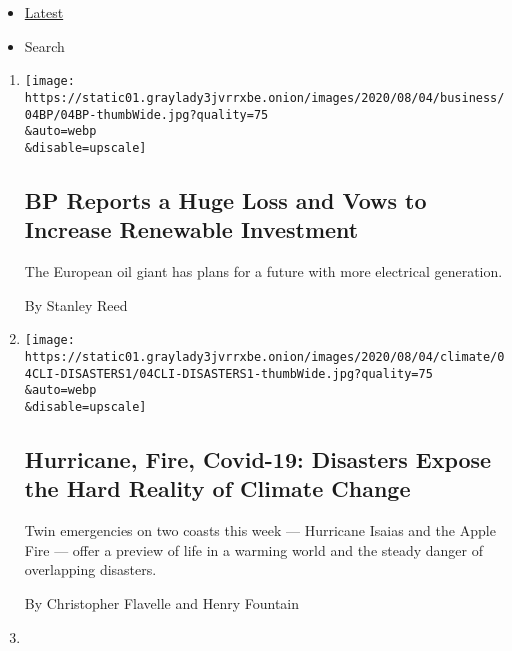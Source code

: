 \begin{itemize}
\tightlist
\item
  \protect\hyperlink{stream-panel}{Latest}
\item
  Search
\end{itemize}

\begin{enumerate}
\def\labelenumi{\arabic{enumi}.}
\item
  \href{/2020/08/04/business/energy-environment/bp-renewable-investment.html}{}

  \texttt{[image: https://static01.graylady3jvrrxbe.onion/images/2020/08/04/business/04BP/04BP-thumbWide.jpg?quality=75\\\&auto=webp\\\&disable=upscale]}

  \hypertarget{bp-reports-a-huge-loss-and-vows-to-increase-renewable-investment}{%
  \subsection{BP Reports a Huge Loss and Vows to Increase Renewable
  Investment}\label{bp-reports-a-huge-loss-and-vows-to-increase-renewable-investment}}

  The European oil giant has plans for a future with more electrical
  generation.

  By Stanley Reed
\item
  \href{/2020/08/04/climate/hurricane-isaias-apple-fire-climate.html}{}

  \texttt{[image: https://static01.graylady3jvrrxbe.onion/images/2020/08/04/climate/04CLI-DISASTERS1/04CLI-DISASTERS1-thumbWide.jpg?quality=75\\\&auto=webp\\\&disable=upscale]}

  \hypertarget{hurricane-fire-covid-19-disasters-expose-the-hard-reality-of-climate-change}{%
  \subsection{Hurricane, Fire, Covid-19: Disasters Expose the Hard
  Reality of Climate
  Change}\label{hurricane-fire-covid-19-disasters-expose-the-hard-reality-of-climate-change}}

  Twin emergencies on two coasts this week --- Hurricane Isaias and the
  Apple Fire --- offer a preview of life in a warming world and the
  steady danger of overlapping disasters.

  By Christopher Flavelle and Henry Fountain
\item
  \href{/2020/08/03/us/politics/trump-tennessee-valley-authority.html}{}


\end{enumerate}
